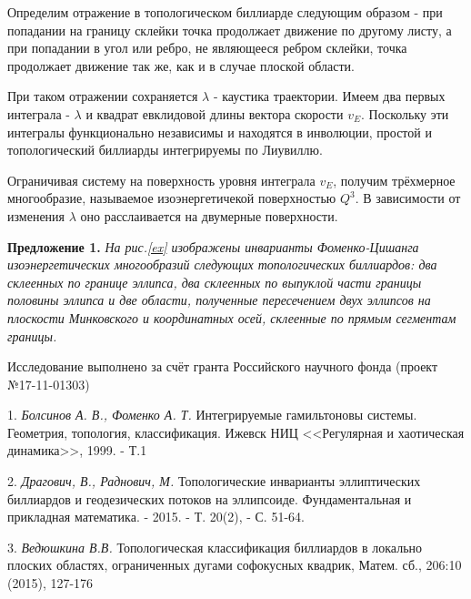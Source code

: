 Определим отражение в топологическом биллиарде следующим образом - при попадании на границу склейки точка продолжает движение по другому листу, а при попадании в угол или ребро, не являющееся ребром склейки, точка продолжает движение так же, как и в случае плоской области.



При таком отражении сохраняется $\lambda$ - каустика траектории. Имеем два первых интеграла - $\lambda$ и квадрат евклидовой длины вектора скорости $v_E$. Поскольку эти интегралы функционально независимы и находятся в инволюции, простой и топологический биллиарды интегрируемы по Лиувиллю.

Ограничивая систему на поверхность уровня интеграла $v_E$, получим трёхмерное многообразие, называемое изоэнергетичекой поверхностью $Q^3$. В зависимости от изменения $\lambda$ оно расслаивается на двумерные поверхности.


\textbf{Предложение 1.} {\it На рис.\ref{ex} изображены инварианты Фо\-ме\-н\-ко-Ци\-ша\-н\-га изоэнергетических многообразий следующих топологических биллиардов: два склеенных по границе эллипса, два склеенных по выпуклой части границы половины эллипса и две области, полученные пересечением двух эллипсов на плоскости Минковского и координатных осей, склеенные по прямым сегментам границы.}

Исследование выполнено за счёт гранта Российского научного фонда (проект №17-11-01303)

\litlist

1. {\it Болсинов А. В., Фоменко А. Т.} Интегрируемые гамильтоновы системы. Геометрия, топология, классификация.  Ижевск НИЦ <<Регулярная и хаотическая динамика>>, 1999. - Т.1


2. {\it Драгович, В., Раднович, М.} Топологические инварианты эллиптических биллиардов и геодезических потоков на эллипсоиде. Фундаментальная и прикладная математика. - 2015. - Т. 20(2), -  С. 51-64.

3. {\it Ведюшкина В.В.} Топологическая классификация биллиардов в локально плоских областях,
ограниченных дугами софокусных квадрик, Матем. сб., 206:10 (2015), 127-176


